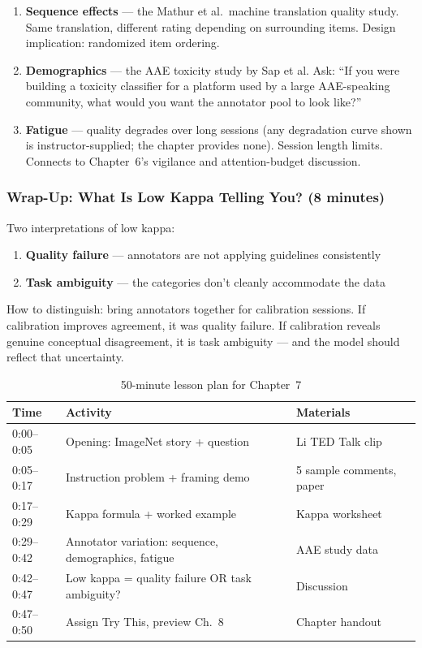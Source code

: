 \begin{enumerate}
    \item \textbf{Sequence effects} --- the Mathur et al.\ machine translation quality study. Same translation, different rating depending on surrounding items. Design implication: randomized item ordering.

    \item \textbf{Demographics} --- the AAE toxicity study by Sap et al. Ask: ``If you were building a toxicity classifier for a platform used by a large AAE-speaking community, what would you want the annotator pool to look like?''

    \item \textbf{Fatigue} --- quality degrades over long sessions (any degradation curve shown is instructor-supplied; the chapter provides none). Session length limits. Connects to Chapter~6's vigilance and attention-budget discussion.
\end{enumerate}

\subsubsection{Wrap-Up: What Is Low Kappa Telling You? (8 minutes)}

Two interpretations of low kappa:
\begin{enumerate}
    \item \textbf{Quality failure} --- annotators are not applying guidelines consistently
    \item \textbf{Task ambiguity} --- the categories don't cleanly accommodate the data
\end{enumerate}

How to distinguish: bring annotators together for calibration sessions. If calibration improves agreement, it was quality failure. If calibration reveals genuine conceptual disagreement, it is task ambiguity --- and the model should reflect that uncertainty.

\begin{table}[htbp]
\caption{50-minute lesson plan for Chapter~7}
\label{tab:lesson-plan-ch07}
\centering
\begin{tabular}{@{}p{2.5cm}p{6cm}p{4cm}@{}}
\toprule
\textbf{Time} & \textbf{Activity} & \textbf{Materials} \\
\midrule
0:00--0:05 & Opening: ImageNet story + question & Li TED Talk clip \\
0:05--0:17 & Instruction problem + framing demo & 5 sample comments, paper \\
0:17--0:29 & Kappa formula + worked example & Kappa worksheet \\
0:29--0:42 & Annotator variation: sequence, demographics, fatigue & AAE study data \\
0:42--0:47 & Low kappa = quality failure OR task ambiguity? & Discussion \\
0:47--0:50 & Assign Try This, preview Ch.\ 8 & Chapter handout \\
\bottomrule
\end{tabular}
\end{table}

